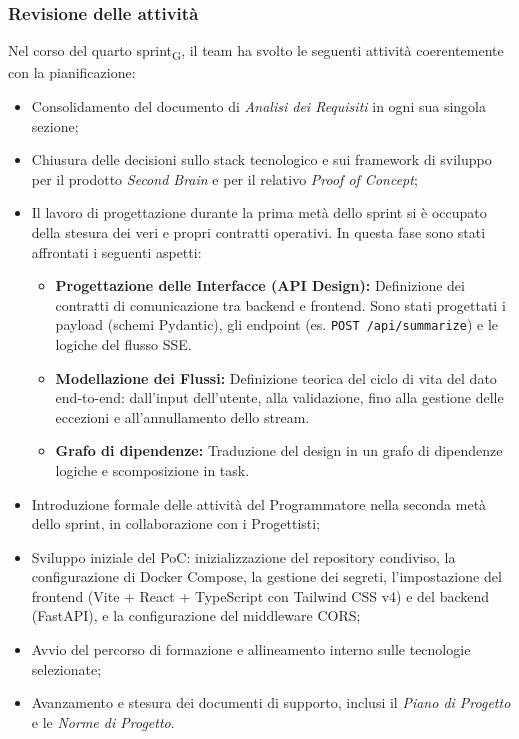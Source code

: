 \documentclass[a4paper, 10pt, colorlinks=true, linkcolor=black, urlcolor=blue, citecolor=blue, hidelinks]{article}
\begin{document}
\subsubsection{Revisione delle attività}
Nel corso del quarto sprint\textsubscript{G}, il team ha svolto le seguenti attività coerentemente con la pianificazione:
\begin{itemize}
    \item Consolidamento del documento di \textit{Analisi dei Requisiti} in ogni sua singola sezione;
    \item Chiusura delle decisioni sullo stack tecnologico e sui framework di sviluppo per il prodotto \textit{Second Brain} e per il relativo \textit{Proof of Concept};
    \item Il lavoro di progettazione durante la prima metà dello sprint si è occupato della stesura dei veri e propri contratti operativi. In questa fase sono stati affrontati i seguenti aspetti:
    \begin{itemize}
        \item \textbf{Progettazione delle Interfacce (API Design):} Definizione dei contratti di comunicazione tra backend e frontend. Sono stati progettati i payload (schemi Pydantic), gli endpoint (es. \texttt{POST /api/summarize}) e le logiche del flusso SSE.
        \item \textbf{Modellazione dei Flussi:} Definizione teorica del ciclo di vita del dato end-to-end: dall'input dell'utente, alla validazione, fino alla gestione delle eccezioni e all'annullamento dello stream.
        \item \textbf{Grafo di dipendenze:} Traduzione del design in un grafo di dipendenze logiche e scomposizione in task.
    \end{itemize}
    \item Introduzione formale delle attività del Programmatore nella seconda metà dello sprint, in collaborazione con i Progettisti;
    \item Sviluppo iniziale del PoC: inizializzazione del repository condiviso, la configurazione di Docker Compose, la gestione dei segreti, l'impostazione del frontend (Vite + React + TypeScript con Tailwind CSS v4) e del backend (FastAPI), e la configurazione del middleware CORS;
    \item Avvio del percorso di formazione e allineamento interno sulle tecnologie selezionate;
    \item Avanzamento e stesura dei documenti di supporto, inclusi il \textit{Piano di Progetto} e le \textit{Norme di Progetto}.
\end{itemize}
\end{document}
